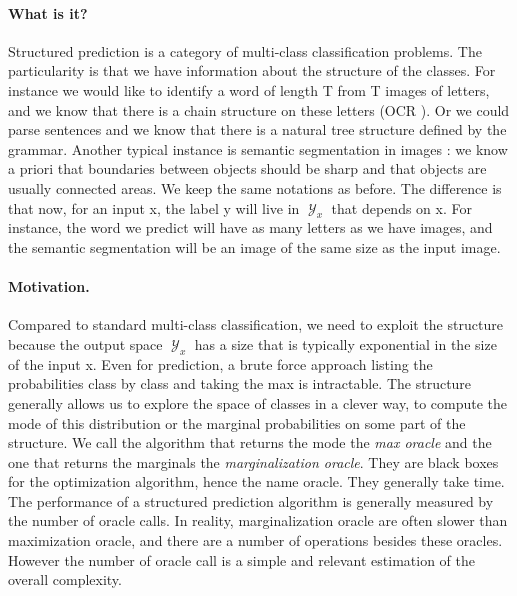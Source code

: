 \documentclass{article}
\DeclareMathOperator{\1}{\mathbb{1}}
\DeclareMathOperator{\Y}{\mathcal{Y}}
\begin{document}
\paragraph{What is it?}
Structured prediction is a category of multi-class classification problems.
The particularity is that we have information about the structure of the classes.
For instance we would like to identify a word of length T from T images of letters, and we know that there is a chain structure on these letters (OCR ).
Or we could parse sentences and we know that there is a natural tree structure defined by the grammar.
Another typical instance is semantic segmentation in images : we know a priori that boundaries between objects should be sharp and that objects are usually connected areas.
We keep the same notations as before.
The difference is that now, for an input x, the label y will live in $\Y_x$ that depends on x.
For instance, the word we predict will have as many letters as we have images, and the semantic segmentation will be an image of the same size as the input image. 

\paragraph{Motivation.}
Compared to standard multi-class classification, we need to exploit the structure because the output space $\Y_x$ has a size that is typically exponential in the size of the input x.
Even for prediction, a brute force approach listing the probabilities class by class and taking the max is intractable.
The structure generally allows us to explore the space of classes in a clever way, to compute the mode of this distribution or the marginal probabilities on some part of the structure.
We call the algorithm that returns the mode the \textit{max oracle} and the one that returns the marginals the \textit{marginalization oracle}.
They are black boxes for the optimization algorithm, hence the name oracle.
They generally take time.
The performance of a structured prediction algorithm is generally measured by the number of oracle calls.
In reality, marginalization oracle are often slower than maximization oracle, and there are a number of operations besides these oracles.
However the number of oracle call is a simple and relevant estimation of the overall complexity.
\end{document}
